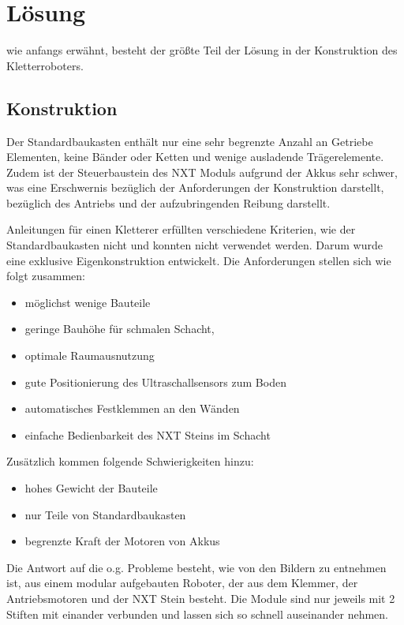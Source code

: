 \section{Lösung}
wie anfangs erwähnt, besteht der größte Teil der Lösung in der Konstruktion des Kletterroboters.
    
\subsection{Konstruktion}
Der Standardbaukasten enthält nur eine sehr begrenzte Anzahl an Getriebe Elementen, keine Bänder oder Ketten und wenige ausladende Trägerelemente. Zudem ist der Steuerbaustein des NXT Moduls aufgrund der Akkus sehr schwer, was eine Erschwernis bezüglich der Anforderungen der Konstruktion darstellt, bezüglich des Antriebs und der aufzubringenden Reibung darstellt.
      
Anleitungen für einen Kletterer erfüllten verschiedene Kriterien, wie der Standardbaukasten nicht und konnten nicht verwendet werden. Darum wurde eine exklusive Eigenkonstruktion entwickelt.
Die Anforderungen stellen sich wie folgt zusammen:
      
\begin{itemize}
	\item möglichst wenige Bauteile
	\item geringe Bauhöhe für schmalen Schacht,
	\item optimale Raumausnutzung
	\item gute Positionierung des Ultraschallsensors zum Boden
	\item automatisches Festklemmen an den Wänden
	\item einfache Bedienbarkeit des NXT Steins im Schacht
\end{itemize}
      
Zusätzlich kommen folgende Schwierigkeiten hinzu:
      
\begin{itemize}
	\item hohes Gewicht der Bauteile
	\item nur Teile von Standardbaukasten
	\item begrenzte Kraft der Motoren von Akkus
\end{itemize}

Die Antwort auf die o.g. Probleme besteht, wie von den Bildern zu entnehmen ist, aus einem modular aufgebauten Roboter, der aus dem Klemmer, der Antriebsmotoren und der NXT Stein besteht. Die Module sind nur jeweils mit 2 Stiften mit einander verbunden und lassen sich so schnell auseinander nehmen.
      
